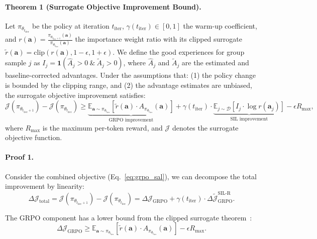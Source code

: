 \documentclass[]{youtu} %
\begin{document}
{\paragraph{Theorem 1 (Surrogate Objective Improvement Bound).} Let $\pi_{\theta_{t_{\text{iter}}}}$ be the policy at iteration $t_{\text{iter}}$, $\gamma(t_{\text{iter}}) \in [0,1]$ the warm-up coefficient, and $r(\mathbf{a}) = \frac{\pi_{\theta_{t_{\text{iter}}+1}}(\mathbf{a})}{\pi_{\theta_{t_{\text{iter}}}}(\mathbf{a})}$ the importance weight ratio with its clipped surrogate $\tilde{r}(\mathbf{a}) = \text{clip}(r(\mathbf{a}), 1-\epsilon, 1+\epsilon)$. We define the good experiences for group sample $j$ as $I_j=\mathbf{1}(\hat{A}_j > 0\ \&\ \tilde{A}_j > 0)$, where $\hat{A}_j$ and $\tilde{A}_j$ are the estimated and baseline-corrected advantages. Under the assumptions that: (1) the policy change is bounded by the clipping range, and (2) the advantage estimates are unbiased, the surrogate objective improvement satisfies:
\begin{equation}
    \mathcal{J}(\pi_{\theta_{t_{\text{iter}}+1}}) - \mathcal{J}(\pi_{\theta_{t_{\text{iter}}}}) \geq \underbrace{\mathbb{E}_{\mathbf{a} \sim \pi_{\theta_{t_{\text{iter}}}}}\left[\tilde{r}(\mathbf{a}) \cdot A_{\pi_{\theta_{t_{\text{iter}}}}}(\mathbf{a})\right]}_{\text{GRPO improvement}} + \gamma(t_{\text{iter}}) \cdot \underbrace{\mathbb{E}_{j \sim \mathcal{D}}\left[I_j \cdot \log r(\mathbf{a}_j)\right]}_{\text{SIL improvement}}-\epsilon R_{\max},
\end{equation}
where $R_{\max}$ is the maximum per-token reward, and $\mathcal{J}$ denotes the surrogate objective function.

\paragraph{Proof 1.} Consider the combined objective (Eq.~\ref{eq:grpo_sal}), we can decompose the total improvement by linearity:
\begin{equation}
    \Delta \mathcal{J}_{\text{total}} = \mathcal{J}(\pi_{\theta_{t_{\text{iter}}+1}}) - \mathcal{J}(\pi_{\theta_{t_{\text{iter}}}}) = \Delta \mathcal{J}_{\text{GRPO}} + \gamma(t_{\text{iter}}) \cdot \Delta \tilde{\mathcal{J}}_{\text{GRPO}}^{\text{SIL-R}}.
\end{equation}

The GRPO component has a lower bound from the clipped surrogate theorem~\cite{schulman2017proximal}:
\begin{equation}
    \Delta \mathcal{J}_{\text{GRPO}} \geq \mathbb{E}_{\mathbf{a} \sim \pi_{\theta_{t_{\text{iter}}}}}\left[\tilde{r}(\mathbf{a}) \cdot A_{\pi_{\theta_{t_{\text{iter}}}}}(\mathbf{a})\right] - \epsilon R_{\max}.
\end{equation}

}
\end{document}
